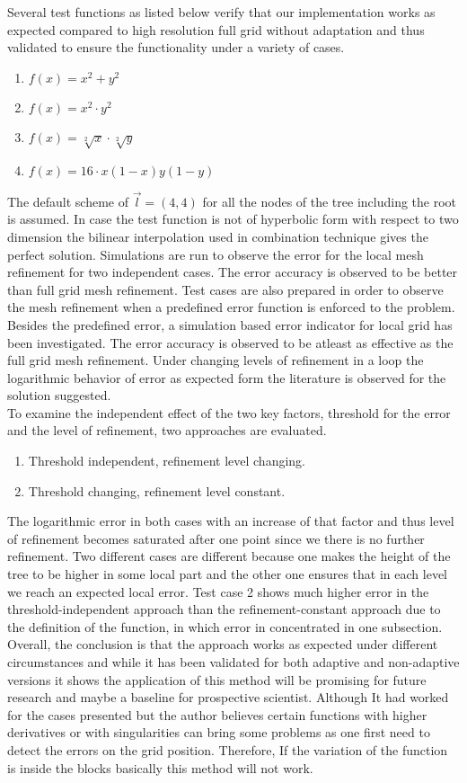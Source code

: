 Several test functions as listed below verify that our implementation works as expected compared to high resolution full grid without adaptation and thus validated  to ensure the functionality under a variety of cases.
\begin{enumerate}
\item $f(x)=x^2+y^2$
\item $f(x)=x^2 \cdot y^2 $
\item $f(x)=\sqrt[2]{x} \cdot \sqrt[2]{y}$
\item $f(x)=16 \cdot x(1-x)y(1-y)$
\end{enumerate}
The default scheme of $\overrightarrow{l}=(4,4)$ for all the nodes of the tree including the root is assumed. In case the test function is not of hyperbolic form with respect to two dimension the bilinear interpolation used in combination technique gives the perfect solution. Simulations are run to observe the error for the local mesh refinement for two independent cases. The error accuracy is observed to be better than full grid mesh refinement. Test cases are also prepared in order to observe the mesh refinement when a predefined error function is enforced to the problem. Besides the predefined error, a simulation based error indicator for local grid has been investigated. The error accuracy is observed to be atleast as effective as the full grid mesh refinement. Under changing levels of refinement in a loop the logarithmic behavior of error as expected form the literature is observed for the solution suggested.\\
To examine the independent effect of the two key factors, threshold for the error and the level of refinement, two approaches are evaluated.
\begin{enumerate}
\item Threshold independent, refinement level changing.
\item Threshold changing, refinement level constant.
\end{enumerate}
The logarithmic error in both cases with an increase of that factor and thus level of refinement becomes saturated after one point since we there is no further refinement. Two different cases are different because one makes the height of the tree to be higher in some local part and the other one ensures that in each level we reach an expected local error. Test case 2 shows much higher error in the threshold-independent approach than the refinement-constant approach due to the definition of the function, in which error in concentrated in one subsection.\\
Overall, the conclusion is that the approach works as expected under different circumstances and while it has been validated for both adaptive and non-adaptive versions it shows the application of this method will be promising for future research and maybe a baseline for prospective scientist. Although It had worked for the cases presented but the author believes certain functions with higher derivatives or with singularities can bring some problems as one first need to detect the errors on the grid position. Therefore, If the variation of the function is inside the blocks basically this method will not work.

